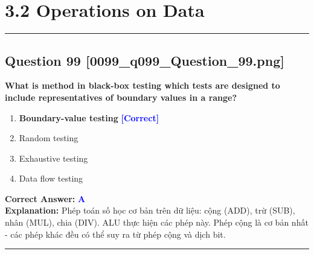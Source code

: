 \documentclass[11pt,a4paper]{article}
\begin{document}
\newpage
\section*{3.2 Operations on Data}
\hrule\vspace{0.5cm}

\begin{minipage}{\textwidth}
\subsection*{Question 99 \quad \footnotesize{[0099\_q099\_Question\_99.png]}}
\noindent \textbf{What is method in black-box testing which tests are designed to include representatives of boundary values in a range?}

\begin{enumerate}[label=\Alph*.]
    \item \textbf{Boundary-value testing} \hfill \textcolor{blue}{\textbf{[Correct]}}
    \item Random testing
    \item Exhaustive testing
    \item Data flow testing
\end{enumerate}

\noindent \textbf{Correct Answer:} \textcolor{blue}{\textbf{A}} \\[2pt]
\noindent \textbf{Explanation:} Phép toán số học cơ bản trên dữ liệu: cộng (ADD), trừ (SUB), nhân (MUL), chia (DIV). ALU thực hiện các phép này. Phép cộng là cơ bản nhất - các phép khác đều có thể suy ra từ phép cộng và dịch bit.

\par\vspace{0.3cm}
\hrule
\vspace{0.3cm}
\end{minipage}
\end{document}

